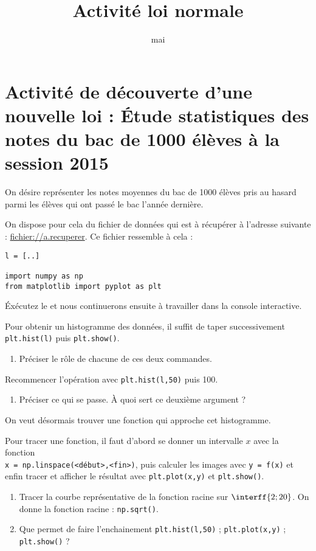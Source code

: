 \documentclass[12pt,french]{article}
\title{Activité loi normale}
\date{mai \the\year}
\author{\bsc{Jumel}}
\begin{document}
	
\maketitle

\section*{Activité de découverte d'une nouvelle loi : Étude statistiques
des notes du bac de 1000 élèves à la session 2015}

On désire représenter les notes moyennes du bac de 1000 élèves pris au
hasard parmi les élèves qui ont passé le bac l'année dernière.

On dispose pour cela du fichier de données qui est à récupérer à
l'adresse suivante : \url{fichier://a.recuperer}. Ce fichier ressemble à
cela :
\begin{verbatim}
l = [..]

import numpy as np
from matplotlib import pyplot as plt
\end{verbatim}

Éxécutez le et nous continuerons ensuite à travailler dans la console
interactive.

Pour obtenir un histogramme des données, il suffit de taper
successivement \texttt{plt.hist(l)} puis \texttt{plt.show()}.

\begin{enumerate}
  \item Préciser le rôle de chacune de ces deux commandes.
\end{enumerate}

Recommencer l'opération avec \texttt{plt.hist(l,50)} puis 100.

\begin{enumerate}[resume*]
  \item Préciser ce qui se passe. À quoi sert ce deuxième argument ?
\end{enumerate}

On veut désormais trouver une fonction qui approche cet histogramme.

Pour tracer une fonction, il faut d'abord se donner un intervalle $x$
avec la fonction \\
\texttt{x = np.linspace(<début>,<fin>)}, puis calculer
les images avec \texttt{y = f(x)} et enfin tracer et afficher le
résultat avec \texttt{plt.plot(x,y)} et \texttt{plt.show()}.

\begin{enumerate}[resume*]
  \item Tracer la courbe représentative de la fonction racine sur
    $\interff{2;20}$. On donne la fonction racine : \texttt{np.sqrt()}.
  \item Que permet de faire l'enchainement \texttt{plt.hist(l,50)} ;
    \texttt{plt.plot(x,y)} ; \texttt{plt.show()} ?
\end{enumerate}
\end{document}
